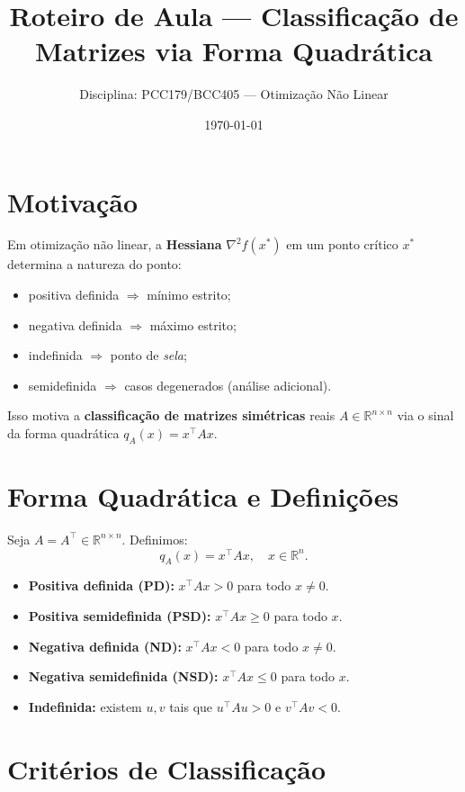 \documentclass[9pt,a4paper]{extarticle}
\begin{document}
\title{Roteiro de Aula --- Classifica\c c\~ao de Matrizes via Forma Quadr\'atica}
\author{Disciplina: PCC179/BCC405 --- Otimiza\c c\~ao N\~ao Linear}
\date{\today}
\maketitle

\section{Motiva\c c\~ao}
Em otimiza\c c\~ao n\~ao linear, a \textbf{Hessiana} $\nabla^2 f(x^\ast)$ em um ponto cr\'itico $x^\ast$ determina a natureza do ponto:
\begin{itemize}
  \item positiva definida $\Rightarrow$ m\'inimo estrito;
  \item negativa definida $\Rightarrow$ m\'aximo estrito;
  \item indefinida $\Rightarrow$ ponto de \textit{sela};
  \item semidefinida $\Rightarrow$ casos degenerados (an\'alise adicional).
\end{itemize}
Isso motiva a \textbf{classifica\c c\~ao de matrizes sim\'etricas} reais $A \in \mathbb{R}^{n\times n}$ via o sinal da forma quadr\'atica $q_A(x)=x^\top A x$.

\section{Forma Quadr\'atica e Defini\c c\~oes}
Seja $A=A^\top \in \mathbb{R}^{n\times n}$. Definimos:
\[
q_A(x) = x^\top A x, \quad x\in\mathbb{R}^n.
\]
\begin{itemize}
  \item \textbf{Positiva definida (PD):} $x^\top A x>0$ para todo $x\neq 0$.
  \item \textbf{Positiva semidefinida (PSD):} $x^\top A x\ge 0$ para todo $x$.
  \item \textbf{Negativa definida (ND):} $x^\top A x<0$ para todo $x\neq 0$.
  \item \textbf{Negativa semidefinida (NSD):} $x^\top A x\le 0$ para todo $x$.
  \item \textbf{Indefinida:} existem $u,v$ tais que $u^\top A u>0$ e $v^\top A v<0$.
\end{itemize}

\section{Crit\'erios de Classifica\c c\~ao}
\end{document}
